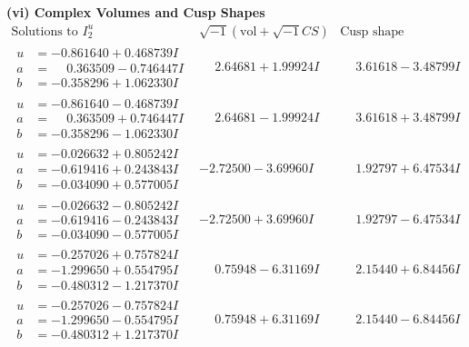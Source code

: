 \documentclass[1p]{elsarticle_modified}
\theoremstyle{definition}
\newcommand{\I}{\sqrt{-1}}
\begin{document}
\newpage\flushleft \textbf{(vi) Complex Volumes and Cusp Shapes}
$$\begin{array}{c|c|c}  
\text{Solutions to }I^u_{2}& \I (\text{vol} + \sqrt{-1}CS) & \text{Cusp shape}\\
 \hline 
\begin{aligned}
u &= -0.861640 + 0.468739 I \\
a &= \phantom{-}0.363509 - 0.746447 I \\
b &= -0.358296 + 1.062330 I\end{aligned}
 & \phantom{-}2.64681 + 1.99924 I & \phantom{-}3.61618 - 3.48799 I \\ \hline\begin{aligned}
u &= -0.861640 - 0.468739 I \\
a &= \phantom{-}0.363509 + 0.746447 I \\
b &= -0.358296 - 1.062330 I\end{aligned}
 & \phantom{-}2.64681 - 1.99924 I & \phantom{-}3.61618 + 3.48799 I \\ \hline\begin{aligned}
u &= -0.026632 + 0.805242 I \\
a &= -0.619416 + 0.243843 I \\
b &= -0.034090 + 0.577005 I\end{aligned}
 & -2.72500 - 3.69960 I & \phantom{-}1.92797 + 6.47534 I \\ \hline\begin{aligned}
u &= -0.026632 - 0.805242 I \\
a &= -0.619416 - 0.243843 I \\
b &= -0.034090 - 0.577005 I\end{aligned}
 & -2.72500 + 3.69960 I & \phantom{-}1.92797 - 6.47534 I \\ \hline\begin{aligned}
u &= -0.257026 + 0.757824 I \\
a &= -1.299650 + 0.554795 I \\
b &= -0.480312 - 1.217370 I\end{aligned}
 & \phantom{-}0.75948 - 6.31169 I & \phantom{-}2.15440 + 6.84456 I \\ \hline\begin{aligned}
u &= -0.257026 - 0.757824 I \\
a &= -1.299650 - 0.554795 I \\
b &= -0.480312 + 1.217370 I\end{aligned}
 & \phantom{-}0.75948 + 6.31169 I & \phantom{-}2.15440 - 6.84456 I \\ \hline\begin{aligned}

\end{aligned}
\end{array}$$
\end{document}

